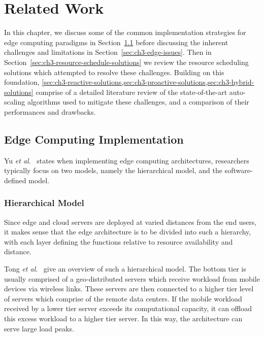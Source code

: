 \clearpage

\def\chaptertitle{Related Work}

\lhead{\emph{\chaptertitle}}

\chapter{\chaptertitle}
\label{ch:lit-review}

In this chapter, we discuss some of the common implementation strategies for edge computing paradigms in Section~\ref{sec:ch3-edge-implementation} before discussing the inherent challenges and limitations in Section~\ref{sec:ch3-edge-issues}. Then in Section~\ref{sec:ch3-resource-schedule-solutions} we review the resource scheduling solutions which attempted to resolve these challenges. Building on this foundation, \cref{sec:ch3-reactive-solutions,sec:ch3-proactive-solutions,sec:ch3-hybrid-solutions} comprise of a detailed literature review of the state-of-the-art auto-scaling algorithms used to mitigate these challenges, and a comparison of their performances and drawbacks.

\section{Edge Computing Implementation}
\label{sec:ch3-edge-implementation}

Yu \textit{et al}.~\cite{yu2017survey} states when implementing edge computing architectures, researchers typically focus on two models, namely the hierarchical model, and the software-defined model.\par

\subsection{Hierarchical Model}
\label{subsec:ch3-hierarchical-model}

Since edge and cloud servers are deployed at varied distances from the end users, it makes sense that the edge architecture is to be divided into such a hierarchy, with each layer defining the functions relative to resource availability and distance.\par

Tong \textit{et al}.~\cite{tong2016hierarchical} give an overview of such a hierarchical model. The bottom tier is usually comprised of a geo-distributed servers which receive workload from mobile devices via wireless links. These servers are then connected to a higher tier level of servers which comprise of the remote data centers. If the mobile workload received by a lower tier server exceeds its computational capacity, it can offload this excess workload to a higher tier server. In this way, the architecture can serve large load peaks.\par

